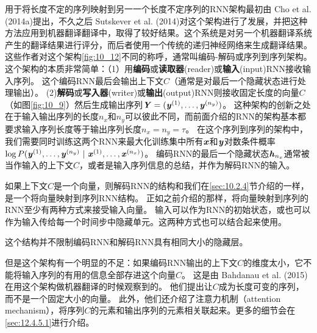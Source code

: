 用于将长度不定的序列映射到另一一个长度不定序列的RNN架构最初由 Cho et al. (2014a)提出，不久之后 Sutskever et al. (2014)对这个架构进行了发展，并把这种方法应用到机器翻译翻译中，取得了较好结果。这个系统是对另一个机器翻译系统产生的翻译结果进行评分，而后者使用一个传统的递归神经网络来生成翻译结果。
这些作者对这个架构\ref{fig:10_12}不同的称呼，通常叫编码-解码或序列到序列架构。
这个架构的本质非常简单：（1）用\textbf{编码}或\textbf{读取器}(reader)或\textbf{输入}(input)RNN接收输入序列。
这个编码RNN最后会输出上下文$C$（通常是对最后一个隐藏状态进行处理输出）。
(2)\textbf{解码}或\textbf{写入器}(writer)或\textbf{输出}(output)RNN则接收固定长度的向量$C$（如图\ref{fig:10_9}）然后生成输出序列$\boldsymbol{\mathit{Y}}=(\boldsymbol{\mathit{y}}^{(1)}, \dots, \boldsymbol{\mathit{y}}^{(n_y)})$。
这种架构的创新之处在于输入输出序列的长度$n_x$和$n_y$可以彼此不同，而前面介绍的RNN的架构基本都要求输入序列长度等于输出序列长度$n_x = n_y = \tau$。
在这个序列到序列的架构中，我们需要同时训练这两个RNN来最大化训练集中所有$\boldsymbol{\mathit{x}}$和$\boldsymbol{\mathit{y}}$对数条件概率$\log P( \boldsymbol{\mathit{y}}^{(1)}, \dots, \boldsymbol{\mathit{y}}^{(n_y)} ~|~ \boldsymbol{\mathit{x}}^{(1)},\dots,\boldsymbol{\mathit{x}}^{(n_x)} )$。
编码RNN的最后一个隐藏状态$\boldsymbol{\mathit{h}}_{n_x}$通常被当作输入的上下文$C$，或者是输入序列信息的总结，并作为解码RNN的输入。

如果上下文$C$是一个向量，则解码RNN的结构和我们在\ref{sec:10.2.4}节介绍的一样，是一个将向量映射到序列RNN结构。
正如之前介绍的那样，将向量映射到序列的RNN至少有两种方式来接受输入向量。
输入可以作为RNN的初始状态，或也可以作为输入传给每一个时间步中隐藏单元。这两种方式也可以结合起来使用。

这个结构并不限制编码RNN和解码RNN具有相同大小的隐藏层。

但是这个架构有一个明显的不足：如果编码RNN输出的上下文$C$的维度太小，它不能将输入序列的有用的信息全部存进这个向量$C$。
这是由 Bahdanau et al. (2015)在用这个架构做机器翻译的时候观察到的。
他们提出让$C$成为长度可变的序列，而不是一个固定大小的向量。
此外，他们还介绍了注意力机制（attention mechanism），将序列$C$的元素和输出序列的元素相关联起来。更多的细节会在\ref{sec:12.4.5.1}进行介绍。
